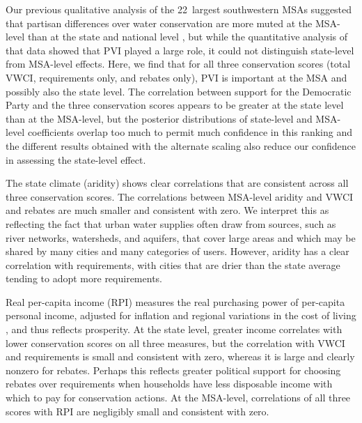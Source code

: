 \documentclass[draft,linenumbers]{agujournal}
\begin{document}
Our previous qualitative analysis of the 22~largest southwestern MSAs suggested
that partisan differences over water conservation are more muted at the
MSA-level than at the state and national level \citep{hess:drought:2016}, but
while the quantitative analysis of that data showed that PVI played a large
role, it could not distinguish state-level from MSA-level effects.
Here, we find that for all three conservation scores (total VWCI, requirements
only, and rebates only), PVI is important at the MSA and possibly also the state level.
The correlation between
support for the Democratic Party
and the three conservation scores appears to be
greater at the state level than at the MSA-level, but the posterior
distributions of state-level and MSA-level coefficients overlap too much to
permit much confidence in this ranking and the different results obtained
with the alternate scaling also reduce our confidence in assessing the state-level
effect.

The state climate (aridity) shows clear
correlations
that are consistent across all three conservation scores.
The
correlations between
MSA-level aridity
and
VWCI and rebates are much
smaller
and consistent with zero.
We interpret this as reflecting the fact that urban water supplies often draw from
sources, such as river networks, watersheds, and aquifers, that cover large areas
and which may be shared by many cities and many categories of users.
However, aridity has a clear
correlation with
requirements, with cities that are
drier than the state average tending to adopt more requirements.

Real per-capita income (RPI) measures the real purchasing power of
per-capita personal income, adjusted for inflation and regional variations in the
cost of living
\citep{bea:rpp.methodology:2016}, and thus reflects prosperity.
At the state level, greater income correlates with lower conservation scores on
all three measures, but the
correlation with VWCI and requirements
is small and
consistent with zero,
whereas it is large and clearly nonzero for rebates.
Perhaps this reflects greater political support for choosing rebates over
requirements when households have less disposable income with which to pay for
conservation actions.
At the MSA-level,
correlations of all three scores with RPI
are negligibly small and
consistent with zero.
\end{document}
